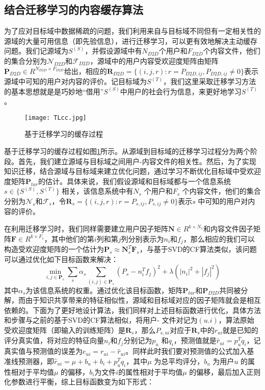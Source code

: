 \documentclass[bachelor]{seuthesis} %
\begin{document}
\begin{Main}
\section{结合迁移学习的内容缓存算法}
为了应对目标域中数据稀疏的问题，我们利用来自与目标域不同但有一定相关性的源域的大量可用信息（即先验信息），进行迁移学习，可以更有效地解决主动缓存问题。我们记源域为$S^{(S)}$，并假设源域中有$N_{D2D}$个用户和$F_{D2D}$个内容文件，他们的集合分别为$\mathcal{N}_{D2D}$和$\mathcal{F}_{D2D}$，源域中的用户内容受欢迎度矩阵由矩阵$\textbf{P}_{D2D}\in R^{N_{D2D}\times F_{D2D}}$给出，相应的$\textbf{R}_{D2D}=\{(i,j,r):r=P_{D2D,ij},P_{D2D,ij}\neq0\}$表示源域中可知的用户对内容的评价。记目标域为$S^{(T)}$，我们这里采取迁移学习方法的基本思想就是是巧妙地“借用”$S^{(S)}$中用户的社会行为信息，来更好地学习$S^{(T)}$。\par
\begin{figure}{}
\centering
\texttt{[image: TLcc.jpg]}
\caption{基于迁移学习的缓存过程}\label{TLcc}
\end{figure}
基于迁移学习的缓存过程如图\ref{TLcc}所示。从源域到目标域的迁移学习过程分为两个阶段。首先，我们建立源域与目标域之间用户-内容文件的相关性。然后，为了实现知识迁移，结合源域与目标域来建立优化问题，通过学习不断优化目标域中受欢迎度矩阵$\textbf{P}_{tar}$的估计。具体来说，我们假设源域和目标域都与一个信息系统$s\in\{S^{(S)},S^{(T)}\}$ 相关，该信息系统中有$N_{s}$ 个用户和$F_{s}$ 个内容文件，他们的集合分别为$\mathcal{N}_{s}$和$\mathcal{F}_{s}$，令$\textbf{R}_{s}=\{(i,j,r):r=P_{s,ij},P_{s,ij}\neq0\}$表示$s$ 中可知的用户对内容的评价。\par
在利用迁移学习时，我们同样需要建立用户因子矩阵$\textbf{N}\in R^{k\times N_s}$和内容文件因子矩阵$\textbf{F}\in R^{k\times F_s}$，其中他们的第$i$列和第$j$列分别表示为$n_i$和$f_j$，那么相应的我们可以构造受欢迎度矩阵的一个估计为$\textbf{P}_s\approx \textbf{N}_s^T\textbf{F}_s$，与基于SVD的CF算法类似，该问题可以通过优化如下目标函数来解决：
\begin{equation}
\min_{i,j\in\textbf{P}_s}\sum_s\alpha_s\sum_{(i,j)\in\textbf{P}_s}(P_s-n_i^Tf_j)^2+\lambda(|n_i|^2+|f_j|^2)
\end{equation}
其中$\alpha_s$为该信息系统的权重。通过优化该目标函数，矩阵$\textbf{P}_{tar}$和$\textbf{P}_{D2D}$共同被分解，而由于知识共享带来的特征相似性，源域和目标域对应的因子矩阵就会是相互依赖的。下面为了更好地设计算法，我们同样对上述目标函数进行优化，具体方法和步骤与之前的基于SVD的CF算法相似，将用户- 文件对记为$(u.i)$，算法原始受欢迎度矩阵（即输入的训练矩阵）是$\textbf{R}_{s}$，那么$P_{s,ui}$对应于$\textbf{R}_{s}$中的$r_{ui}$就是已知的评分真实值，将对应的特征向量$n_i$和$f_j$分别记为$p_u$ 和$q_i$，预测值就是$\hat{r}_{ui}=p_u^Tq_i$，记真实值与预测值的误差为$e_{ui}=r_{ui}-\hat{r}_{ui}$。同样此时我们要对预测值的公式加入基准线预测器，即$\hat{r}_{ui}=\mu+b_u+b_i+p_u^Tq_i$，其中$\mu$ 为总平均评分，$b_u$ 为用户$u$ 的属性相对于平均值$\mu$ 的偏移，$b_i$为文件$i$的属性相对于平均值$\mu$ 的偏移，最后加入正则化参数进行平衡，综上目标函数变为如下形式：

\end{Main}
\end{document}
